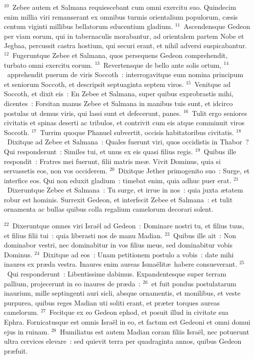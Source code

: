 ${}^{10}$~Zebee autem et Salmana requiescebant cum omni exercitu suo. Quindecim enim millia viri remanserant ex omnibus turmis orientalium populorum, c\ae sis centum viginti millibus bellatorum educentium gladium.
${}^{11}$~Ascendensque Gedeon per viam eorum, qui in tabernaculis morabantur, ad orientalem partem Nobe et Jegbaa, percussit castra hostium, qui securi erant, et nihil adversi suspicabantur.
${}^{12}$~Fugeruntque Zebee et Salmana, quos persequens Gedeon comprehendit, turbato omni exercitu eorum.
${}^{13}$~Revertensque de bello ante solis ortum,
${}^{14}$~apprehendit puerum de viris Soccoth~: interrogavitque eum nomina principum et seniorum Soccoth, et descripsit septuaginta septem viros.
${}^{15}$~Venitque ad Soccoth, et dixit eis~: En Zebee et Salmana, super quibus exprobrastis mihi, dicentes~: Forsitan manus Zebee et Salmana in manibus tuis sunt, et idcirco postulas ut demus viris, qui lassi sunt et defecerunt, panes.
${}^{16}$~Tulit ergo seniores civitatis et spinas deserti ac tribulos, et contrivit cum eis atque comminuit viros Soccoth.
${}^{17}$~Turrim quoque Phanuel subvertit, occisis habitatoribus civitatis.
${}^{18}$~Dixitque ad Zebee et Salmana~: Quales fuerunt viri, quos occidistis in Thabor~? Qui responderunt~: Similes tui, et unus ex eis quasi filius regis.
${}^{19}$~Quibus ille respondit~: Fratres mei fuerunt, filii matris me\ae . Vivit Dominus, quia si servassetis eos, non vos occiderem.
${}^{20}$~Dixitque Jether primogenito suo~: Surge, et interfice eos. Qui non eduxit gladium~: timebat enim, quia adhuc puer erat.
${}^{21}$~Dixeruntque Zebee et Salmana~: Tu surge, et irrue in nos~: quia juxta \ae tatem robur est hominis. Surrexit Gedeon, et interfecit Zebee et Salmana~: et tulit ornamenta ac bullas quibus colla regalium camelorum decorari solent.


${}^{22}$~Dixeruntque omnes viri Isra\"el ad Gedeon~: Dominare nostri tu, et filius tuus, et filius filii tui~: quia liberasti nos de manu Madian.
${}^{23}$~Quibus ille ait~: Non dominabor vestri, nec dominabitur in vos filius meus, sed dominabitur vobis Dominus.
${}^{24}$~Dixitque ad eos~: Unam petitionem postulo a vobis~: date mihi inaures ex pr\ae da vestra. Inaures enim aureas Isma\"elit\ae\ habere consueverant.
${}^{25}$~Qui responderunt~: Libentissime dabimus. Expandentesque super terram pallium, projecerunt in eo inaures de pr\ae da~:
${}^{26}$~et fuit pondus postulatarum inaurium, mille septingenti auri sicli, absque ornamentis, et monilibus, et veste purpurea, quibus reges Madian uti soliti erant, et pr\ae ter torques aureas camelorum.
${}^{27}$~Fecitque ex eo Gedeon ephod, et posuit illud in civitate sua Ephra. Fornicatusque est omnis Isra\"el in eo, et factum est Gedeoni et omni domui ejus in ruinam.
${}^{28}$~Humiliatus est autem Madian coram filiis Isra\"el, nec potuerunt ultra cervices elevare~: sed quievit terra per quadraginta annos, quibus Gedeon pr\ae fuit.


